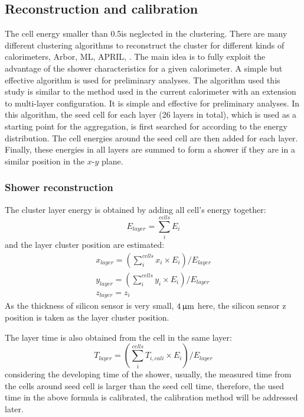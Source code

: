\subsection{Reconstruction and calibration}
\label{sec:rec}
 
The cell energy smaller than 0.5\mev is neglected in the clustering.
There are many different clustering algorithms to reconstruct the cluster for different kinds of calorimeters,
\eg Arbor, ML, APRIL, \etal \supercite{ruan2014arbor,Belayneh2019CalorimetryWD,Li:2020llf}. 
The main idea is to fully exploit the advantage of the shower characteristics for a given calorimeter. 
A simple but effective algorithm is used for preliminary analyses. 
The algorithm used this study is similar to the method used in the current \lhcb calorimeter with an extension to multi-layer configuration. 
It is simple and effective for preliminary analyses. 
In this algorithm, 
the seed cell for each layer (26 layers in total), 
which is used as a starting point for the aggregation, is first searched for according to the energy distribution.
The cell energies around the seed cell are then added for each layer.
Finally, these energies in all layers are summed to form a shower if they are in a similar position in the $x$-$y$ plane.


\subsubsection{Shower reconstruction}
The cluster layer energy is obtained by adding all cell's energy together:
\begin{equation}
E_{layer} = \sum_{i}^{cells}{E_i}
\end{equation}
and the layer cluster position are estimated: 
\begin{equation}
\begin{split}
x_{layer} = (\sum_{i}^{cells}{x_i \times E_i})/E_{layer} \\
y_{layer} = (\sum_{i}^{cells}{y_i \times E_i})/E_{layer} \\
z_{layer} = z_i
\end{split}
\end{equation}
As the thickness of silicon sensor is very small,
$4\,\upmu\text{m}$ here, 
the silicon sensor z position is taken as the layer cluster position.

The layer time is also obtained from the cell in the same layer:
\begin{equation}
T_{layer} = (\sum_{i}^{cells}{T_{i,cali} \times E_i})/E_{layer}
\end{equation}
considering the developing time of the shower,
usually, 
the measured time from the cells around seed cell is larger than the seed cell time,
therefore, 
the used time in the above formula is calibrated,
the calibration method will be addressed later.

